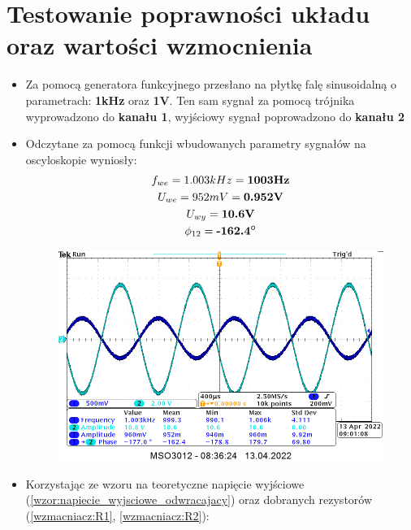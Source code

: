 \section{Testowanie poprawności układu oraz wartości wzmocnienia}
\begin{itemize}
    \item Za pomocą generatora funkcyjnego przesłano na płytkę falę sinusoidalną o parametrach: \textbf{1kHz} oraz \textbf{1V}. Ten sam sygnał za pomocą trójnika wyprowadzono do \textbf{kanału 1}, wyjściowy sygnał poprowadzono do \textbf{kanału 2}
    \item Odczytane za pomocą funkcji wbudowanych parametry sygnałów na oscyloskopie wyniosły:
        \begin{gather}
            \label{wzmacniacz_parametry:czestotliwosc}f_{we} = 1.003kHz = \textbf{1003Hz} \\
            \label{wzmacniacz_parametry:u_we} U_{we} = 952mV = \textbf{0.952V} \\
            \label{wzmacniacz_parametry:u_wy} U_{wy} = \textbf{10.6V} \\
            \label{wzmacniacz_parametry:przesuniecie}\phi_{12} = \textbf{-162.4}\boldsymbol{\degree}
        \end{gather}
        \begin{figure}[H]
            \centering
            \includegraphics[scale=0.4]{img/osciloscope/dzialajacy_wzmacniacz_cropped.png}
            \caption{}
            \label{fig:dzialajacy_wzmacniacz}
        \end{figure}
    \item Korzystając ze wzoru na teoretyczne napięcie wyjściowe (\ref{wzor:napiecie_wyjsciowe_odwracajacy}) oraz dobranych rezystorów (\ref{wzmacniacz:R1}, \ref{wzmacniacz:R2}):

\end{itemize}
